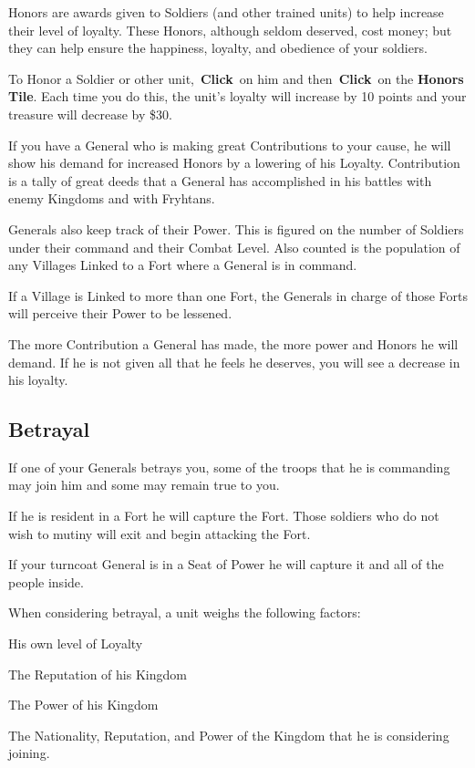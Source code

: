 Honors are awards given to Soldiers (and other trained units) to help increase their level of loyalty. These Honors, although seldom deserved, cost money; but they can help ensure the happiness, loyalty, and obedience of your soldiers.

To Honor a Soldier or other unit, \textbf{Click} on him and then \textbf{Click} on the \textbf{Honors Tile}. Each time you do this, the unit’s loyalty will increase by 10 points and your treasure will decrease by \$30.

If you have a General who is making great Contributions to your cause, he will show his demand for increased Honors by a lowering of his Loyalty. Contribution is a tally of great deeds that a General has accomplished in his battles with enemy Kingdoms and with Fryhtans.

Generals also keep track of their Power. This is figured on the number of Soldiers under their command and their Combat Level. Also counted is the population of any Villages Linked to a Fort where a General is in command.

If a Village is Linked to more than one Fort, the Generals in charge of those Forts will perceive their Power to be lessened.

The more Contribution a General has made, the more power and Honors he will demand. If he is not given all that he feels he deserves, you will see a decrease in his loyalty.

\subsection{Betrayal}

 If one of your Generals betrays you, some of the troops that he is commanding may join him and some may remain true to you.

If he is resident in a Fort he will capture the Fort. Those soldiers who do not wish to mutiny will exit and begin attacking the Fort.

If your turncoat General is in a Seat of Power he will capture it and all of the people inside.

When considering betrayal, a unit weighs the following factors:

\begin{adjustwidth}{1cm}{}
His own level of Loyalty

The Reputation of his Kingdom

The Power of his Kingdom

The Nationality, Reputation, and Power of the Kingdom that he is considering joining.
\end{adjustwidth}